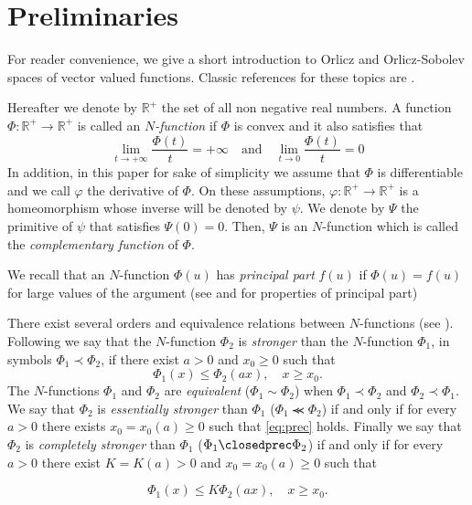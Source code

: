 \documentclass[twoside]{article}
\theoremstyle{remark}
\renewcommand{\leq}{\leqslant}
\renewcommand{\geq}{\geqslant}
\begin{document}
\section{Preliminaries}\label{preliminares}

For reader convenience, we give a short introduction to Orlicz and Orlicz-Sobolev spaces of vector valued functions. Classic references for these topics are \cite{adams_sobolev,KR,rao1991theory}. 

Hereafter we denote  by $\mathbb{R}^+$  the set of all non negative real numbers. A function $\Phi:\mathbb{R}^+\to \mathbb{R}^+ $ is called an \emph{$N$-function} if $\Phi$ is convex and it also satisfies that
\[
\lim_{t\to+\infty}\frac{\Phi(t)}{t}=+\infty\quad\text{and}\quad \lim_{t\to 0}\frac{\Phi(t)}{t}=0
\]
In addition,  in this paper for sake of simplicity  we assume that $\Phi$ is differentiable and we call $\varphi$  the derivative of $\Phi$. 
On these assumptions, $\varphi:\mathbb{R}^+\rightarrow \mathbb{R}^+$ is a homeomorphism whose inverse will be denoted by $\psi$. 
We denote by $\Psi$ the primitive of $\psi$ that satisfies $\Psi(0)=0$. Then, $\Psi$ is an $N$-function which  is called the \emph{complementary function} of $\Phi$.

 We recall that an $N$-function $\Phi(u)$ has \emph{principal part} $f(u)$ if $\Phi(u)=f(u)$ for large values of the argument (see \cite[p. 16]{KR} and \cite[Sec. 7]{KR} for  properties of principal part)

There exist several orders and equivalence relations between $N$-functions (see \cite[Sec. 2.2]{rao1991theory}).
Following \cite[Def. 1, pp. 15-16]{rao1991theory} we say that the   $N$-function $\Phi_2$ is \emph{stronger} than the $N$-function  $\Phi_1$, in symbols  $\Phi_1\prec\Phi_2$, if  there exist $a>0$ and $x_0\geq 0$ such that
\begin{equation}\label{eq:prec}\Phi_1(x)\leq \Phi_2(ax), \quad x\geq x_0.\end{equation}
 The $N$-functions  $\Phi_1$ and   $\Phi_2$ are \emph{equivalent} ($\Phi_1\sim\Phi_2$)  when  $\Phi_1\prec\Phi_2$ and $\Phi_2\prec\Phi_1$.
We say that  $\Phi_2$ is \emph{essentially stronger} than  $\Phi_1$  ($\Phi_1\llcurly\Phi_2$) if and only if for every $a>0$ there exists $x_0=x_0(a)\geq 0$ such that \eqref{eq:prec} holds. Finally we say that  $\Phi_2$ is \emph{completely stronger} than  $\Phi_1$  ($\Phi_1\closedprec\Phi_2$) if and only if for every $a>0$ there exist $K=K(a)>0$ and  $x_0=x_0(a)\geq 0$ such that


\begin{equation}\label{eq:prec2}\Phi_1(x)\leq K\Phi_2(ax), \quad x\geq x_0.\end{equation}
\end{document}
